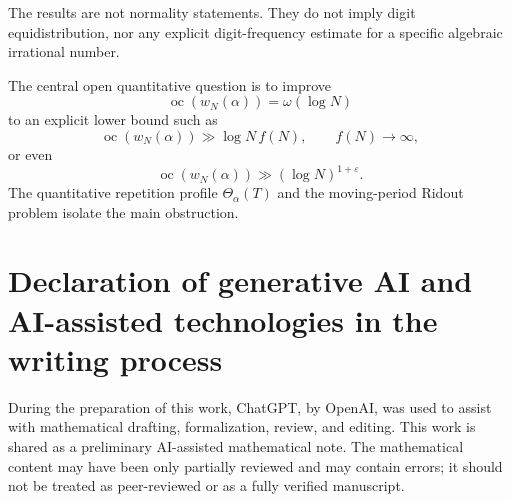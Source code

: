 \documentclass[11pt]{amsart}
\theoremstyle{definition}
\DeclareMathOperator{\oc}{oc}
\begin{document}
The results are not normality statements. They do not imply digit equidistribution, nor any explicit digit-frequency estimate for a specific algebraic irrational number.

The central open quantitative question is to improve
\[
\oc(w_N(\alpha))=\omega(\log N)
\]
to an explicit lower bound such as
\[
\oc(w_N(\alpha))
\gg
\log N\,f(N),
\qquad
f(N)\to\infty,
\]
or even
\[
\oc(w_N(\alpha))
\gg
(\log N)^{1+\varepsilon}.
\]
The quantitative repetition profile \(\Theta_\alpha(T)\) and the moving-period Ridout problem isolate the main obstruction.

\section*{Declaration of generative AI and AI-assisted technologies in the writing process}

During the preparation of this work, ChatGPT, by OpenAI, was used to assist with mathematical drafting, formalization, review, and editing. This work is shared as a preliminary AI-assisted mathematical note. The mathematical content may have been only partially reviewed and may contain errors; it should not be treated as peer-reviewed or as a fully verified manuscript.
\end{document}
